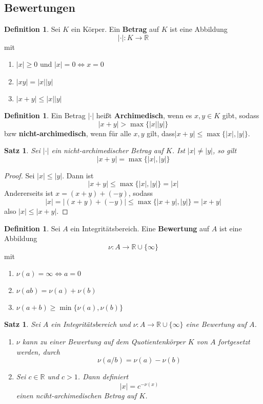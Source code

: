 \documentclass[10pt,a4paper]{article}
\newcommand{\R}{\ensuremath{\mathbb{R}}}
\newcommand{\abs}[1]{\left|#1\right|}
\theoremstyle{plain}
\newtheorem{satz}[theorem]{Satz}
\theoremstyle{definition}
\newtheorem{definition}[theorem]{Definition}
\theoremstyle{remark}
\begin{document}
	
	
	\subsection{Bewertungen}
	\begin{definition}
		Sei $K$ ein Körper. Ein \textbf{Betrag} auf $K$ ist eine Abbildung
		\[|\cdot|:K\to\R\] mit
		\begin{enumerate}
			\item $\abs{x}\geq 0$ und $\abs{x}=0\Leftrightarrow x=0$
			\item $\abs{xy}=\abs x\abs y$
			\item $\abs{x+y}\leq \abs x\abs y$
		\end{enumerate}
	\end{definition}
	\begin{definition}
		Ein Betrag $\abs{\cdot}$ heißt \textbf{Archimedisch}, wenn es $x,y\in K$ gibt, sodass
		\[\abs{x+y}>\max\{\abs x\abs y\}\]
		bzw \textbf{nicht-archimedisch}, wenn für alle $x,y$ gilt, dass$|x+y|\leq \max\{\abs x,\abs y\}$.
	\end{definition}

	\begin{satz}
		Sei $\abs\cdot$ ein  nicht-archimedischer Betrag auf $K$. Ist $\abs x\neq \abs y$, so gilt
		\[\abs{x+y}=\max\{\abs x,\abs y\}\]
	\end{satz}
	\begin{proof}
		Sei $\abs x\leq \abs y$. Dann ist 
		\[\abs{x+y}\leq\max\{\abs x,\abs y\}=\abs x\]
		Andererseits ist $x=(x+y)+(-y)$, sodass
		\[\abs x=\abs{(x+y)+(-y)}\leq\max\{\abs{x+y},\abs y\}=\abs{x+y}\]
		also $\abs x\leq\abs{x+y}$.
	\end{proof}

	\begin{definition}
		Sei $A$ ein Integritätsbereich. Eine \textbf{Bewertung} auf $A$ ist eine Abbildung
		\[\nu:A\to\R\cup\{\infty\}\]
		mit
		\begin{enumerate}
			\item $\nu(a)=\infty\Leftrightarrow a=0$
			\item $\nu(ab)=\nu(a)+\nu(b)$
			\item $\nu(a+b)\geq\min\{\nu(a),\nu(b)\}$
		\end{enumerate}
	\end{definition}

	\begin{satz}
		Sei $A$ ein Integritätsbereich und $\nu:A\to\R\cup\{\infty\}$ eine Bewertung auf $A$.
		\begin{enumerate}
			\item $\nu$ kann zu einer Bewertung auf dem Quotientenkörper $K$ von $A$ fortgesetzt werden, durch
			\[\nu(a/b)=\nu(a)-\nu(b)\]
			\item Sei $c\in\R$ und $c> 1$. Dann definiert
			\[\abs{x}=c^{-\nu(x)}\]
			einen nciht-archimedischen Betrag auf $K$.
		\end{enumerate}
	\end{satz}
\end{document}

